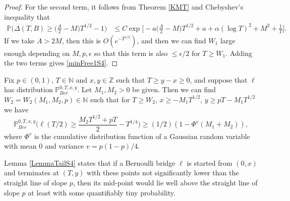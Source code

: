 \begin{proof}
	For the second term, it follows from Theorem \ref{KMT} and Chebyshev's inequality that
	\begin{align*}
	\mathbb{P}\Big(\Delta(T,B) \geq \Big(\frac{A}{2} - M\Big)T^{1/2} - 1\Big) &\leq C\exp\Big[-a\Big(\frac{A}{2}- M\Big)T^{1/2} + a + \alpha(\log T)^2 + M^2 + \frac{1}{T}\Big].
	\end{align*}
	If we take $A > 2M$, then this is $O(e^{-T^{1/2}})$, and then we can find $W_1$ large enough depending on $M,p,\epsilon$ so that this term is also $\leq\epsilon/2$ for $T\geq W_1$. Adding the two terms gives \eqref{minFree1S4}.
\end{proof}

\begin{lemma}\label{LemmaTailS4}Fix $p \in (0,1)$, $T \in \mathbb{N}$ and $x, y\in \mathbb{Z}$ such that $T \geq y-x \geq 0$, and suppose that $\ell$ has distribution $\mathbb{P}^{0,T,x,y}_{Ber}$. Let $M_1,M_2 > 0$ be given. Then we can find $W_2 = W_2(M_1,M_2,p) \in \mathbb{N}$ such that for $T \geq W_2$, $ x \geq -M_1T^{1/2}$, $ y \geq pT -  M_1T^{1/2}$ we have
\begin{equation}\label{halfEq2S4}
\mathbb{P}^{0,T,x,y}_{Ber}\bigg( \ell( T/2 )  \geq \frac{M_2T^{1/2} + p T}{2} - T^{1/4} \bigg) \geq (1/2) (1 - \Phi^{v}(M_1 + M_2) ),
\end{equation}
where $\Phi^{v}$ is the cumulative distribution function  of a Gaussian random variable with mean $0$ and variance $v = p(1-p)/4$.
\end{lemma}
\begin{remark} Lemma \ref{LemmaTailS4} states that  if a Bernoulli bridge $\ell$ is started from $(0,x)$ and terminates at $(T,y)$ with these points not significantly lower than the straight line of slope $p$, then its mid-point would lie well above the straight line of slope $p$ at least with some quantifiably tiny probability.
\end{remark}
